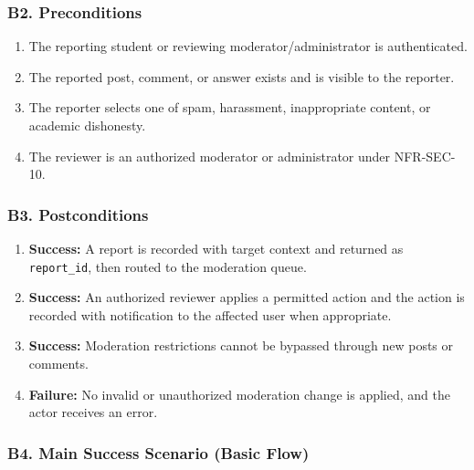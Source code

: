 \documentclass[12pt]{article}
\begin{document}
\hypertarget{sec:b2-preconditions}{}
\subsubsection*{B2. Preconditions}
\par\medskip

\begin{enumerate}
\item The reporting student or reviewing moderator/administrator is authenticated.
\item The reported post, comment, or answer exists and is visible to the reporter.
\item The reporter selects one of spam, harassment, inappropriate content, or academic dishonesty.
\item The reviewer is an authorized moderator or administrator under NFR-SEC-10.
\end{enumerate}
\par\medskip

\hypertarget{sec:b3-postconditions}{}
\subsubsection*{B3. Postconditions}
\par\medskip

\begin{enumerate}
\item \textbf{Success:} A report is recorded with target context and returned as \texttt{report\_id}, then routed to the moderation queue.
\item \textbf{Success:} An authorized reviewer applies a permitted action and the action is recorded with notification to the affected user when appropriate.
\item \textbf{Success:} Moderation restrictions cannot be bypassed through new posts or comments.
\item \textbf{Failure:} No invalid or unauthorized moderation change is applied, and the actor receives an error.
\end{enumerate}
\par\medskip

\hypertarget{sec:b4-main-success-scenario-basic-flow}{}
\subsubsection*{B4. Main Success Scenario (Basic Flow)}
\par\medskip
\end{document}
